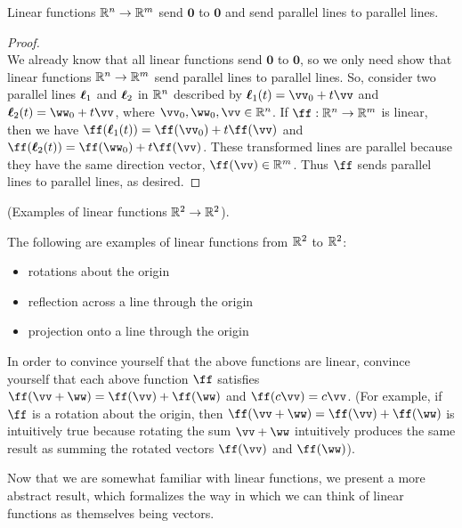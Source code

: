 \begin{theorem}
    Linear functions $\mathbb{R}^n \rightarrow \mathbb{R}^m$ send $\mathbf{0}$ to $\mathbf{0}$ and send parallel lines to parallel lines.
\end{theorem}

\begin{proof}
    \mbox{} \\ \indent
    We already know that all linear functions send $\mathbf{0}$ to $\mathbf{0}$, so we only need show that linear functions $\mathbb{R}^n \rightarrow \mathbb{R}^m$ send parallel lines to parallel lines. So, consider two parallel lines $\boldsymbol{\ell}_1$ and $\boldsymbol{\ell}_2$ in $\mathbb{R}^n$ described by $\eell_1(t) = \vv_0 + t\vv$ and $\eell_2(t) = \ww_0 + t\vv$, where $\vv_0, \ww_0, \vv \in \R^n$. If $\ff:\R^n \rightarrow \R^m$ is linear, then we have $\ff(\eell_1(t)) = \ff(\vv_0) + t \ff(\vv)$ and $\ff(\eell_2(t)) = \ff(\ww_0) + t \ff(\vv)$. These transformed lines are parallel because they have the same direction vector, $\ff(\vv) \in \R^m$. Thus $\ff$ sends parallel lines to parallel lines, as desired.
\end{proof}

\begin{remark}
    (Examples of linear functions $\mathbb{R}^2 \rightarrow \mathbb{R}^2$).
    
    The following are examples of linear functions from $\mathbb{R}^2$ to $\mathbb{R}^2$:
    
    \begin{itemize}
        \item rotations about the origin
        \item reflection across a line through the origin
        \item projection onto a line through the origin
    \end{itemize}
    
    In order to convince yourself that the above functions are linear, convince yourself that each above function $\ff$ satisfies $\ff(\vv + \ww) = \ff(\vv) + \ff(\ww)$ and $\ff(c \vv) = c \vv$. (For example, if $\ff$ is a rotation about the origin, then $\ff(\vv + \ww) = \ff(\vv) + \ff(\ww)$ is intuitively true because rotating the sum $\vv + \ww$ intuitively produces the same result as summing the rotated vectors $\ff(\vv)$ and $\ff(\ww)$).
\end{remark}

Now that we are somewhat familiar with linear functions, we present a more abstract result, which formalizes the way in which we can think of linear functions as themselves being vectors.

